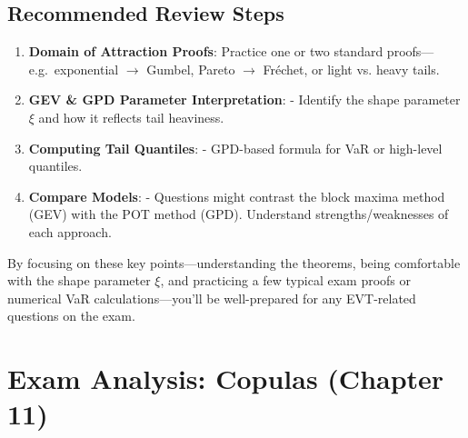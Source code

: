 \documentclass[13pt,a4paper]{article}
\begin{document}
\subsection{Recommended Review Steps}
\begin{enumerate}
  \item \textbf{Domain of Attraction Proofs}: Practice one or two standard proofs—e.g.\ exponential \(\to\) Gumbel, Pareto \(\to\) Fréchet, or light vs. heavy tails.
  \item \textbf{GEV \& GPD Parameter Interpretation}: 
    - Identify the shape parameter \(\xi\) and how it reflects tail heaviness.  
  \item \textbf{Computing Tail Quantiles}: 
    - GPD-based formula for VaR or high-level quantiles. 
  \item \textbf{Compare Models}: 
    - Questions might contrast the block maxima method (GEV) with the POT method (GPD). Understand strengths/weaknesses of each approach.
\end{enumerate}

\noindent
By focusing on these key points—understanding the theorems, being comfortable with the shape parameter \(\xi\), and practicing a few typical exam proofs or numerical VaR calculations—you’ll be well-prepared for any EVT-related questions on the exam.

\section{Exam Analysis: Copulas (Chapter 11)}
\label{sec:copulas_exam_analysis}
\end{document}
